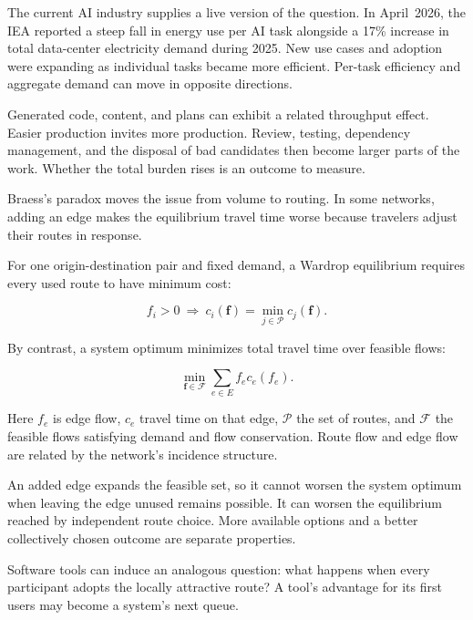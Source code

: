 The current AI industry supplies a live version of the question. In April~2026, the IEA reported a steep fall in energy use per AI task alongside a 17\% increase in total data-center electricity demand during 2025. New use cases and adoption were expanding as individual tasks became more efficient.\cite{iea2026questions} Per-task efficiency and aggregate demand can move in opposite directions.

Generated code, content, and plans can exhibit a related throughput effect. Easier production invites more production. Review, testing, dependency management, and the disposal of bad candidates then become larger parts of the work. Whether the total burden rises is an outcome to measure.

Braess's paradox moves the issue from volume to routing. In some networks, adding an edge makes the equilibrium travel time worse because travelers adjust their routes in response.\cite{braess1968}

For one origin-destination pair and fixed demand, a Wardrop equilibrium requires every used route to have minimum cost:

\begin{equation}
f_i>0\ \Longrightarrow\
c_i(\mathbf f)=\min_{j\in\mathcal P}c_j(\mathbf f).
\end{equation}

By contrast, a system optimum minimizes total travel time over feasible flows:

\begin{equation}
\min_{\mathbf f\in\mathcal F}
\sum_{e\in E}f_e c_e(f_e).
\end{equation}

Here $f_e$ is edge flow, $c_e$ travel time on that edge, $\mathcal P$ the set of routes, and $\mathcal F$ the feasible flows satisfying demand and flow conservation. Route flow and edge flow are related by the network's incidence structure.

An added edge expands the feasible set, so it cannot worsen the system optimum when leaving the edge unused remains possible. It can worsen the equilibrium reached by independent route choice. More available options and a better collectively chosen outcome are separate properties.

Software tools can induce an analogous question: what happens when every participant adopts the locally attractive route? A tool's advantage for its first users may become a system's next queue.


